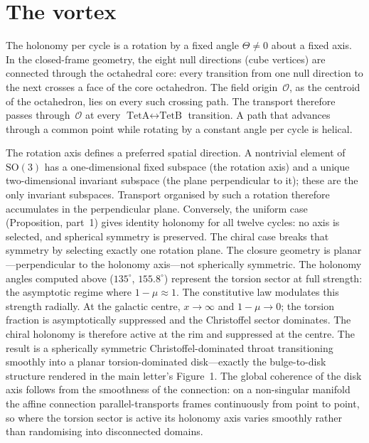 \documentclass[twocolumn]{iopjournal}
\begin{document}

\section*{The vortex}

The holonomy per cycle is a rotation by a fixed angle
$\Theta \neq 0$ about a fixed axis.  In the
closed-frame geometry, the eight null directions (cube
vertices) are connected through the octahedral core:
every transition from one null direction to the next
crosses a face of the core octahedron.  The field
origin~$\mathcal{O}$, as the centroid of the
octahedron, lies on every such crossing path.  The
transport therefore passes through~$\mathcal{O}$ at
every $\text{TetA} \leftrightarrow \text{TetB}$
transition.  A path that advances through a common
point while rotating by a constant angle per cycle is
helical.

The rotation axis defines a preferred spatial direction.
A nontrivial element of $\mathrm{SO}(3)$ has a
one-dimensional fixed subspace (the rotation axis) and a
unique two-dimensional invariant subspace (the plane
perpendicular to it); these are the only invariant
subspaces.  Transport organised by such a
rotation therefore accumulates in the perpendicular plane.
Conversely, the uniform case (Proposition, part~1) gives
identity holonomy for all twelve cycles: no axis is
selected, and spherical symmetry is preserved.  The
chiral case breaks that symmetry by selecting exactly one
rotation plane.  The closure geometry is
planar---perpendicular to the holonomy axis---not
spherically symmetric.  The holonomy angles computed
above ($135^{\circ}$, $155.8^{\circ}$) represent the
torsion sector at full strength: the asymptotic regime
where $1 - \mu \approx 1$.  The constitutive law
modulates this strength radially.  At the galactic
centre, $x \to \infty$ and $1 - \mu \to 0$; the torsion
fraction is asymptotically suppressed and the Christoffel
sector dominates.  The chiral holonomy is therefore
active at the rim and suppressed at the centre.  The
result is a spherically symmetric Christoffel-dominated
throat transitioning smoothly into a planar
torsion-dominated disk---exactly the bulge-to-disk
structure rendered in the main letter's Figure~1.  The
global coherence of the disk axis follows from the
smoothness of the connection: on a non-singular manifold
the affine connection parallel-transports frames
continuously from point to point, so where the torsion
sector is active its holonomy axis varies smoothly rather
than randomising into disconnected domains.
\end{document}
